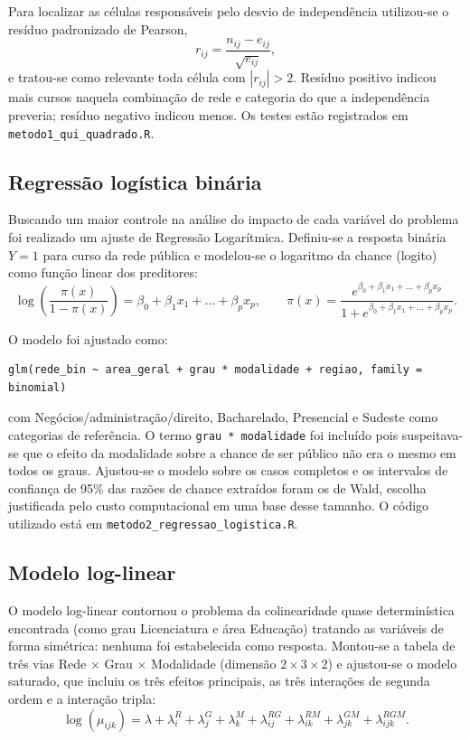 \documentclass[12pt]{article}
\begin{document}
Para localizar as células responsáveis pelo desvio de independência utilizou-se o resíduo padronizado de Pearson,
\begin{equation}
r_{ij} = \frac{n_{ij}-e_{ij}}{\sqrt{e_{ij}}},
\end{equation}
e tratou-se como relevante toda célula com $|r_{ij}| > 2$. Resíduo positivo indicou mais cursos naquela combinação de rede e categoria do que a independência preveria; resíduo negativo indicou menos. Os testes estão registrados em \texttt{metodo1\_qui\_quadrado.R}.

\subsection{Regressão logística binária}
Buscando um maior controle na análise do impacto de cada variável do problema foi realizado um ajuste de Regressão Logarítmica. Definiu-se a resposta binária $Y=1$ para curso da rede pública e modelou-se o logaritmo da chance (logito) como função linear dos preditores:
\begin{equation}
\log\left(\frac{\pi(x)}{1-\pi(x)}\right) = \beta_0 + \beta_1 x_1 + \dots + \beta_p x_p, \qquad \pi(x) = \frac{e^{\beta_0 + \beta_1 x_1 + \dots + \beta_p x_p}}{1 + e^{\beta_0 + \beta_1 x_1 + \dots + \beta_p x_p}}.
\end{equation}

O modelo foi ajustado como:
{\small
\begin{verbatim}
glm(rede_bin ~ area_geral + grau * modalidade + regiao, family = binomial)
\end{verbatim}
}
com Negócios/administração/direito, Bacharelado, Presencial e Sudeste como categorias de referência. O termo \texttt{grau * modalidade} foi incluído pois suspeitava-se que o efeito da modalidade sobre a chance de ser público não era o mesmo em todos os graus. Ajustou-se o modelo sobre os casos completos e os intervalos de confiança de 95\% das razões de chance extraídos foram os de Wald, escolha justificada pelo custo computacional em uma base desse tamanho. O código utilizado está em \texttt{metodo2\_regressao\_logistica.R}.

\subsection{Modelo log-linear}
O modelo log-linear contornou o problema da colinearidade quase determinística encontrada (como grau Licenciatura e área Educação) tratando as variáveis de forma simétrica: nenhuma foi estabelecida como resposta. Montou-se a tabela de três vias Rede $\times$ Grau $\times$ Modalidade (dimensão $2 \times 3 \times 2$) e ajustou-se o modelo saturado, que incluiu os três efeitos principais, as três interações de segunda ordem e a interação tripla:
\begin{equation}
\log(\mu_{ijk}) = \lambda + \lambda_i^{R} + \lambda_j^{G} + \lambda_k^{M} + \lambda_{ij}^{RG} + \lambda_{ik}^{RM} + \lambda_{jk}^{GM} + \lambda_{ijk}^{RGM}.
\end{equation}
\end{document}
